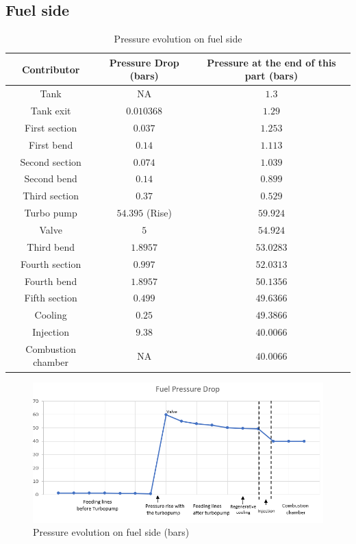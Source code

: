 \subsection{Fuel side}
\begin{table}[H]
	\centering
\begin{tabular}[H]{|c|c|c|}
	\hline
	\cellcolor{gray!50}Contributor& \cellcolor{gray!50}Pressure Drop (bars) & \cellcolor{gray!50}Pressure at the end of this part (bars)\\
	\hline
	Tank & NA & $1.3$ \\
	\hline
	Tank exit & $0.010368$ & $1.29$\\
	\hline
	First section & $0.037$ &$1.253$\\
	\hline
	First bend &$0.14$ &$1.113$\\
	\hline
	Second section &$0.074$ &$1.039$\\
	\hline
	Second bend &$0.14$ &$0.899$\\
	\hline
	Third section &$0.37$ &$0.529$\\
	\hline
	Turbo pump & $54.395 $ (Rise) &$59.924$\\
	\hline
	Valve & $5$ &$54.924$\\
	\hline
	Third bend &$1.8957$ &$53.0283$\\
	\hline
	Fourth section &$0.997$ &$52.0313$\\
	\hline
	Fourth bend &$1.8957$ &$50.1356$\\
	\hline
	Fifth section &$0.499$ &$49.6366$\\
	\hline
	Cooling &$0.25$ &$49.3866$\\
	\hline
	Injection &$9.38$ &$40.0066$\\
	\hline
	Combustion chamber & NA &$40.0066$\\
	\hline
\end{tabular}
\caption{Pressure evolution on fuel side}
\end{table}
\begin{figure}[H]
	\centering
	\includegraphics[width=\linewidth]{fuelchart}
	\caption{Pressure evolution on fuel side (bars)}
\end{figure}
